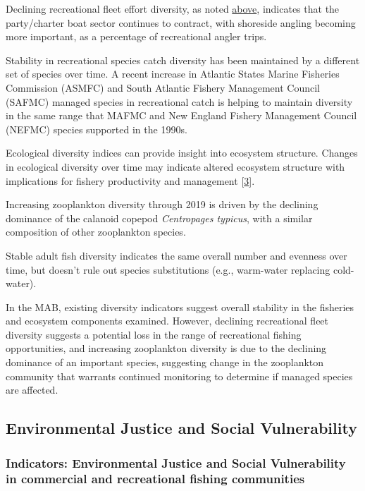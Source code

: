 \documentclass[
  10pt,
]{article}
\begin{document}
Declining recreational fleet effort diversity, as noted
\protect\hyperlink{recreational-opportunities}{above}, indicates that
the party/charter boat sector continues to contract, with shoreside
angling becoming more important, as a percentage of recreational angler
trips.

Stability in recreational species catch diversity has been maintained by
a different set of species over time. A recent increase in Atlantic
States Marine Fisheries Commission (ASMFC) and South Atlantic Fishery
Management Council (SAFMC) managed species in recreational catch is
helping to maintain diversity in the same range that MAFMC and New
England Fishery Management Council (NEFMC) species supported in the
1990s.

Ecological diversity indices can provide insight into ecosystem
structure. Changes in ecological diversity over time may indicate
altered ecosystem structure with implications for fishery productivity
and management {[}\protect\hyperlink{ref-friedland_changes_2020}{3}{]}.

Increasing zooplankton diversity through 2019 is driven by the declining
dominance of the calanoid copepod \emph{Centropages typicus}, with a
similar composition of other zooplankton species.

Stable adult fish diversity indicates the same overall number and
evenness over time, but doesn't rule out species substitutions (e.g.,
warm-water replacing cold-water).

In the MAB, existing diversity indicators suggest overall stability in
the fisheries and ecosystem components examined. However, declining
recreational fleet diversity suggests a potential loss in the range of
recreational fishing opportunities, and increasing zooplankton diversity
is due to the declining dominance of an important species, suggesting
change in the zooplankton community that warrants continued monitoring
to determine if managed species are affected.

\hypertarget{environmental-justice-and-social-vulnerability}{%
\subsection{Environmental Justice and Social
Vulnerability}\label{environmental-justice-and-social-vulnerability}}

\hypertarget{indicators-environmental-justice-and-social-vulnerability-in-commercial-and-recreational-fishing-communities}{%
\subsubsection{Indicators: Environmental Justice and Social
Vulnerability in commercial and recreational fishing
communities}\label{indicators-environmental-justice-and-social-vulnerability-in-commercial-and-recreational-fishing-communities}}
\end{document}
